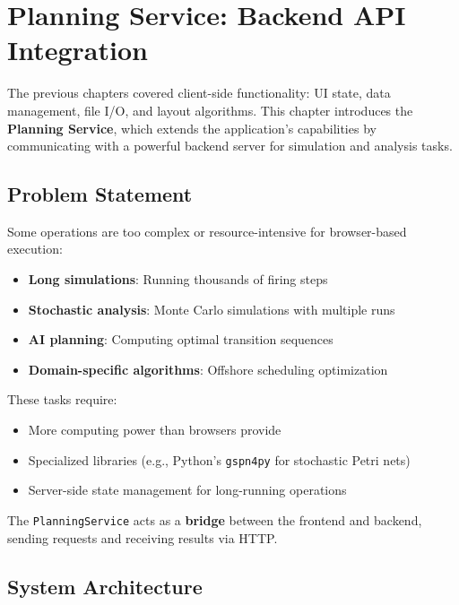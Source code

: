 \chapter{Planning Service: Backend API Integration}
\label{chap:planning-service}

The previous chapters covered client-side functionality: UI state, data management, file I/O, and layout algorithms. This chapter introduces the \textbf{Planning Service}, which extends the application's capabilities by communicating with a powerful backend server for simulation and analysis tasks.

\section{Problem Statement}
\label{sec:planning-problem}

Some operations are too complex or resource-intensive for browser-based execution:

\begin{itemize}
    \item \textbf{Long simulations}: Running thousands of firing steps
    \item \textbf{Stochastic analysis}: Monte Carlo simulations with multiple runs
    \item \textbf{AI planning}: Computing optimal transition sequences
    \item \textbf{Domain-specific algorithms}: Offshore scheduling optimization
\end{itemize}

These tasks require:
\begin{itemize}
    \item More computing power than browsers provide
    \item Specialized libraries (e.g., Python's \texttt{gspn4py} for stochastic Petri nets)
    \item Server-side state management for long-running operations
\end{itemize}

The \texttt{PlanningService} acts as a \textbf{bridge} between the frontend and backend, sending requests and receiving results via HTTP.

\section{System Architecture}
\label{sec:planning-architecture}

